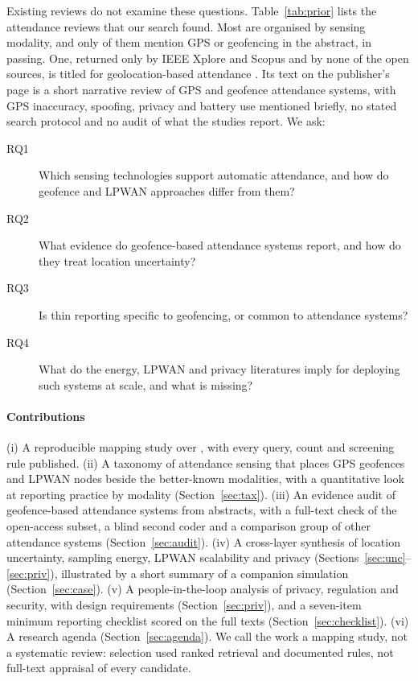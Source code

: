 \documentclass[12pt]{article}
\let\cite\citep
\begin{document}
Existing reviews do not examine these questions. Table~\ref{tab:prior} lists the \nPriorSel{} attendance reviews that our search found. Most are organised by sensing modality, and only \nPriorGps{} of them mention GPS or geofencing in the abstract, in passing. One, returned only by IEEE Xplore and Scopus and by none of the open sources, is titled for geolocation-based attendance \cite{gupta2025geolocation}. Its text on the publisher's page is a short narrative review of GPS and geofence attendance systems, with GPS inaccuracy, spoofing, privacy and battery use mentioned briefly, no stated search protocol and no audit of what the studies report. We ask:
\begin{description}
\item[RQ1] Which sensing technologies support automatic attendance, and how do geofence and LPWAN approaches differ from them?
\item[RQ2] What evidence do geofence-based attendance systems report, and how do they treat location uncertainty?
\item[RQ3] Is thin reporting specific to geofencing, or common to attendance systems?
\item[RQ4] What do the energy, LPWAN and privacy literatures imply for deploying such systems at scale, and what is missing?
\end{description}

\paragraph{Contributions} (i) A reproducible mapping study over \srcPhrase{}, with every query, count and screening rule published. (ii) A taxonomy of attendance sensing that places GPS geofences and LPWAN nodes beside the better-known modalities, with a quantitative look at reporting practice by modality (Section~\ref{sec:tax}). (iii) An evidence audit of \nAudit{} geofence-based attendance systems from abstracts, with a full-text check of the open-access subset, a blind second coder and a comparison group of \nOthersRecent{} other attendance systems (Section~\ref{sec:audit}). (iv) A cross-layer synthesis of location uncertainty, sampling energy, LPWAN scalability and privacy (Sections~\ref{sec:unc}--\ref{sec:priv}), illustrated by a short summary of a companion simulation (Section~\ref{sec:case}). (v) A people-in-the-loop analysis of privacy, regulation and security, with design requirements (Section~\ref{sec:priv}), and a seven-item minimum reporting checklist scored on the full texts (Section~\ref{sec:checklist}). (vi) A research agenda (Section~\ref{sec:agenda}). We call the work a mapping study, not a systematic review: selection used ranked retrieval and documented rules, not full-text appraisal of every candidate.
\end{document}
